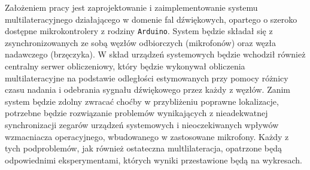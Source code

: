 Założeniem pracy jest zaprojektowanie i zaimplementowanie systemu multilateracyjnego działającego w domenie fal dźwiękowych, opartego o szeroko dostępne mikrokontrolery z rodziny \texttt{Arduino}. System będzie składał się z zsynchronizowanych ze sobą węzłów odbiorczych (mikrofonów) oraz węzła nadawczego (brzęczyka). W skład urządzeń systemowych będzie wchodził również centralny serwer obliczeniowy, który będzie wykonywał obliczenia multilateracyjne na podstawie odległości estymowanych przy pomocy różnicy czasu nadania i odebrania sygnału dźwiękowego przez każdy z węzłów. Zanim system będzie zdolny zwracać choćby w przybliżeniu poprawne lokalizacje, potrzebne będzie rozwiązanie problemów wynikających z nieadekwatnej synchronizacji zegarów urządzeń systemowych i nieoczekiwanych wpływów wzmacniacza operacyjnego, wbudowanego w zastosowane mikrofony. Każdy z tych podproblemów, jak również ostateczna multlilateracja, opatrzone będą odpowiednimi eksperymentami, których wyniki przestawione będą na wykresach.
